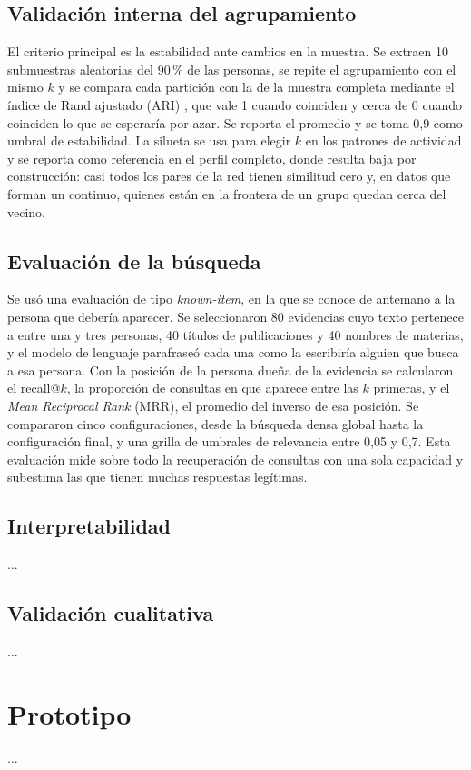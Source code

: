 \subsection{Validación interna del agrupamiento}
\label{sec:met_validacion_interna}

El criterio principal es la estabilidad ante cambios en la muestra. Se extraen 10 submuestras aleatorias del 90\,\% de las personas, se repite el agrupamiento con el mismo $k$ y se compara cada partición con la de la muestra completa mediante el índice de Rand ajustado (ARI) \parencite{Hubert1985}, que vale 1 cuando coinciden y cerca de 0 cuando coinciden lo que se esperaría por azar. Se reporta el promedio y se toma 0,9 como umbral de estabilidad. La silueta se usa para elegir $k$ en los patrones de actividad y se reporta como referencia en el perfil completo, donde resulta baja por construcción: casi todos los pares de la red tienen similitud cero y, en datos que forman un continuo, quienes están en la frontera de un grupo quedan cerca del vecino.

\subsection{Evaluación de la búsqueda}
\label{sec:met_validacion_busqueda}

Se usó una evaluación de tipo \textit{known-item}, en la que se conoce de antemano a la persona que debería aparecer. Se seleccionaron 80 evidencias cuyo texto pertenece a entre una y tres personas, 40 títulos de publicaciones y 40 nombres de materias, y el modelo de lenguaje parafraseó cada una como la escribiría alguien que busca a esa persona. Con la posición de la persona dueña de la evidencia se calcularon el recall@$k$, la proporción de consultas en que aparece entre las $k$ primeras, y el \textit{Mean Reciprocal Rank} (MRR), el promedio del inverso de esa posición. Se compararon cinco configuraciones, desde la búsqueda densa global hasta la configuración final, y una grilla de umbrales de relevancia entre 0,05 y 0,7. Esta evaluación mide sobre todo la recuperación de consultas con una sola capacidad y subestima las que tienen muchas respuestas legítimas.

\subsection{Interpretabilidad}
...

\subsection{Validación cualitativa}
...

\section{Prototipo}
\label{sec:met_prototipo}
...